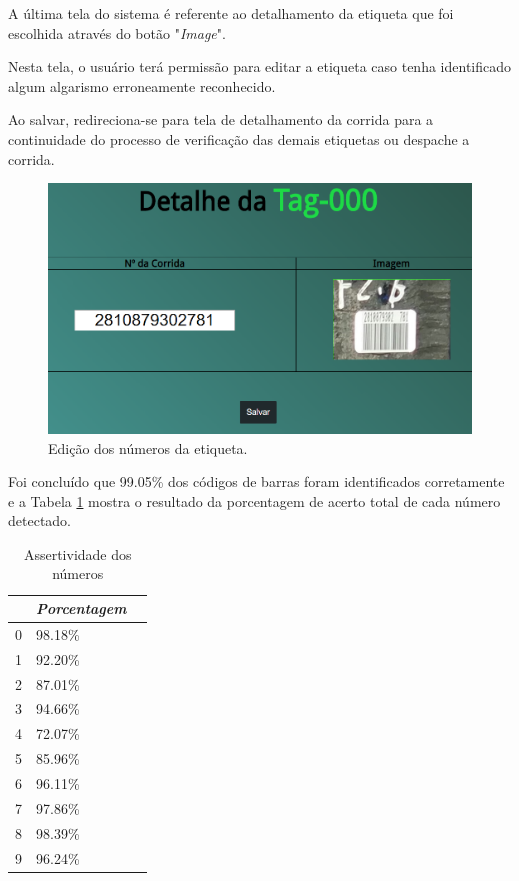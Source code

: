 A última tela do sistema é referente ao detalhamento da etiqueta que foi escolhida através do botão "\textit{Image}".

Nesta tela, o usuário terá permissão para editar a etiqueta caso tenha identificado algum algarismo erroneamente reconhecido.

Ao salvar, redireciona-se para tela de detalhamento da corrida para a continuidade do processo de verificação das demais etiquetas ou despache a corrida.

\begin{figure}[H]
	\centering
	\includegraphics[width=0.8\linewidth]{figuras/WebService/Screens/detail_tag.png}
	\caption{Edição dos números da etiqueta.}
	\label{fig:detail_tag}
\end{figure}


Foi concluído que 99.05\% dos códigos de barras foram identificados corretamente e a Tabela \ref{tab:numberRecognize} mostra o resultado da porcentagem de acerto total de cada número detectado.


\begin{table}[H]
	\centering
	\begin{tabular}{|l|l|l|}
		\hline
		\rowcolor[HTML]{ECF4FF} 
		\multicolumn{1}{|c|}{\cellcolor[HTML]{ECF4FF}\textit{\textit{Número}}} &
		\multicolumn{1}{|c|}{\cellcolor[HTML]{ECF4FF}\textit{Porcentagem}}\\ \hline 
		0&  98.18\% \\ \hline
		1&  92.20\% \\ \hline
		2&  87.01\% \\ \hline
		3&  94.66\%\\ \hline
		4&  72.07\% \\ \hline
		5&  85.96\% \\ \hline
		6&  96.11\% \\ \hline
		7&  97.86\% \\ \hline
		8&  98.39\% \\ \hline
		9&  96.24\% \\ \hline
	\end{tabular}
	\caption{Assertividade dos números}
	\label{tab:numberRecognize}
\end{table}